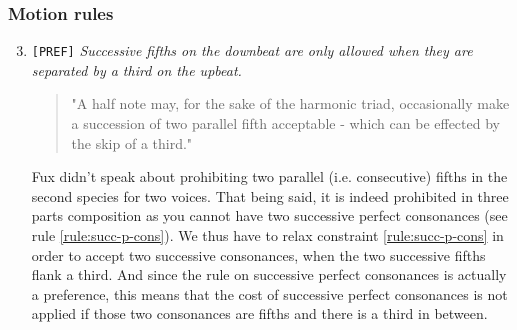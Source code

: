 \subsubsection{Motion rules}
\begin{enumerate}[wide, label=\bfseries 2.P\arabic*]
\setcounter{enumi}{2} 
    \item \texttt{[PREF]} \textit{Successive fifths on the downbeat are only allowed when they are separated by a third on the upbeat.} \label{rule:succ-fifths-flanking-third}    
    \begin{quotation}
        "A half note may, for the sake of the harmonic triad, occasionally make a succession of two parallel fifth acceptable - which can be effected by the skip of a third."
        \textcite[p.86]{GaPEng}
    \end{quotation}
    Fux didn't speak about prohibiting two parallel (i.e. consecutive) fifths in the second species for two voices. That being said, it is indeed prohibited in three parts composition as you cannot have two successive perfect consonances (see rule \ref{rule:succ-p-cons}). We thus have to relax constraint \ref{rule:succ-p-cons} in order to accept two successive consonances, when the two successive fifths flank a third. And since the rule on successive perfect consonances is actually a preference, this means that the cost of successive perfect consonances is not applied if those two consonances are fifths and there is a third in between.


\end{enumerate}
